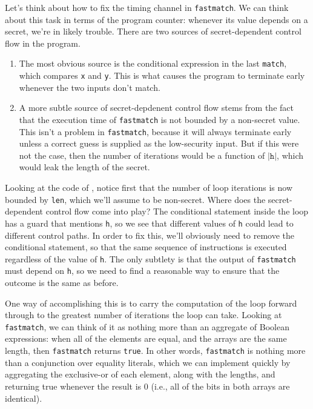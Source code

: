 \documentclass[11pt,twoside]{scrartcl}
\begin{document}
Let's think about how to fix the timing channel in \texttt{fastmatch}. We can think about this task in terms of the program counter: whenever its value depends on a secret, we're in likely trouble. There are two sources of secret-dependent control flow in the program.
\begin{enumerate}
\item The most obvious source is the conditional expression in the last \texttt{match}, which compares \texttt{x} and \texttt{y}. This is what causes the program to terminate early whenever the two inputs don't match.
\item A more subtle source of secret-depdenent control flow stems from the fact that the execution time of \texttt{fastmatch} is not bounded by a non-secret value. This isn't a problem in \texttt{fastmatch}, because it will always terminate early unless a correct guess is supplied as the low-security input. But if this were not the case, then the number of iterations would be a function of $|\mathtt{h}|$, which would leak the length of the secret.
\end{enumerate}

Looking at the code of , notice first that the number of loop iterations is now bounded by \texttt{len}, which we'll assume to be non-secret. Where does the secret-dependent control flow come into play? The conditional statement inside the loop has a guard that mentions \texttt{h}, so we see that different values of \texttt{h} could lead to different control paths. In order to fix this, we'll obviously need to remove the conditional statement, so that the same sequence of instructions is executed regardless of the value of \texttt{h}. The only subtlety is that the output of \texttt{fastmatch} must depend on \texttt{h}, so we need to find a reasonable way to ensure that the outcome is the same as before.

One way of accomplishing this is to carry the computation of the loop forward through to the greatest number of iterations the loop can take. Looking at \texttt{fastmatch}, we can think of it as nothing more than an aggregate of Boolean expressions: when all of the elements are equal, and the arrays are the same length, then \verb'fastmatch' returns \verb'true'. 
In other words, \texttt{fastmatch} is nothing more than a conjunction over equality literals, which we can implement quickly by aggregating the exclusive-or of each element, along with the lengths, and returning true whenever the result is 0 (i.e., all of the bits in both arrays are identical).
\end{document}
